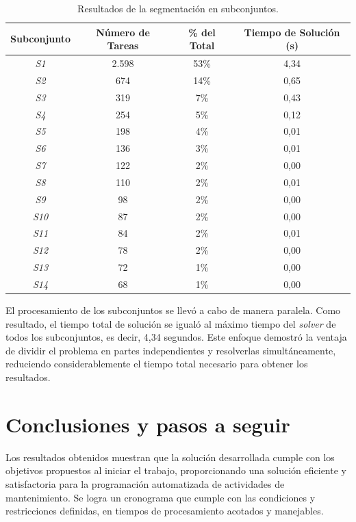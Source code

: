 \documentclass{article}
\begin{document}
\begin{table}[htbp]
    \centering
    \begin{tabular}{cccc}
        \toprule
        \textbf{Subconjunto} & \textbf{Número de Tareas} & \textbf{\% del Total} & \textbf{Tiempo de Solución (s)} \\
        \midrule
        \textit{S1} & 2.598 & 53\% & 4,34 \\
        \textit{S2} & 674 & 14\% & 0,65 \\
        \textit{S3} & 319 & 7\% & 0,43 \\
        \textit{S4} & 254 & 5\% & 0,12 \\
        \textit{S5} & 198 & 4\% & 0,01 \\
        \textit{S6} & 136 & 3\% & 0,01 \\
        \textit{S7} & 122 & 2\% & 0,00 \\
        \textit{S8} & 110 & 2\% & 0,01 \\
        \textit{S9} & 98 & 2\% & 0,00 \\
        \textit{S10} & 87 & 2\% & 0,00 \\
        \textit{S11} & 84 & 2\% & 0,01 \\
        \textit{S12} & 78 & 2\% & 0,00 \\
        \textit{S13} & 72 & 1\% & 0,00 \\
        \textit{S14} & 68 & 1\% & 0,00 \\
        \bottomrule
    \end{tabular}
    \caption{Resultados de la segmentación en subconjuntos.}
    \label{tab:subsets_results}
\end{table}

El procesamiento de los subconjuntos se llevó a cabo de manera paralela. Como resultado, el tiempo total de solución se igualó al máximo tiempo del \textit{solver} de todos los subconjuntos, es decir, 4,34 segundos. Este enfoque demostró la ventaja de dividir el problema en partes independientes y resolverlas simultáneamente, reduciendo considerablemente el tiempo total necesario para obtener los resultados.

\section{Conclusiones y pasos a seguir}


Los resultados obtenidos muestran que la solución desarrollada cumple con los objetivos propuestos al iniciar el trabajo, proporcionando una solución eficiente y satisfactoria para la programación automatizada de actividades de mantenimiento. Se logra un cronograma que cumple con las condiciones y restricciones definidas, en tiempos de procesamiento acotados y manejables.
\end{document}
